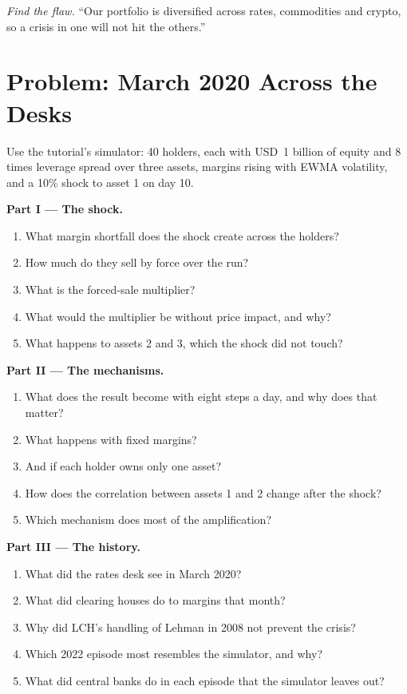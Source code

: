 \begin{exercise}[$\star\star\star$]\label{exo:m3:when-markets-break-together:8}
\emph{Find the flaw.} ``Our portfolio is diversified across rates, commodities and crypto, so a crisis in one will not hit the others.''
\end{exercise}

\section{Problem: March 2020 Across the Desks}

\begin{problem}\label{pb:m3:when-markets-break-together:1}
Use the tutorial's simulator: 40 holders, each with USD~1 billion of equity and 8 times leverage spread over three assets, margins rising with EWMA volatility, and
a 10\% shock to asset 1 on day 10.

\medskip\noindent\textbf{Part I --- The shock.}
\begin{enumerate}
\item What margin shortfall does the shock create across the holders?
\item How much do they sell by force over the run?
\item What is the forced-sale multiplier?
\item What would the multiplier be without price impact, and why?
\item What happens to assets 2 and 3, which the shock did not touch?
\end{enumerate}

\medskip\noindent\textbf{Part II --- The mechanisms.}
\begin{enumerate}[resume]
\item What does the result become with eight steps a day, and why does that matter?
\item What happens with fixed margins?
\item And if each holder owns only one asset?
\item How does the correlation between assets 1 and 2 change after the shock?
\item Which mechanism does most of the amplification?
\end{enumerate}

\medskip\noindent\textbf{Part III --- The history.}
\begin{enumerate}[resume]
\item What did the rates desk see in March 2020?
\item What did clearing houses do to margins that month?
\item Why did LCH's handling of Lehman in 2008 not prevent the crisis?
\item Which 2022 episode most resembles the simulator, and why?
\item What did central banks do in each episode that the simulator leaves out?
\end{enumerate}


\end{problem}
